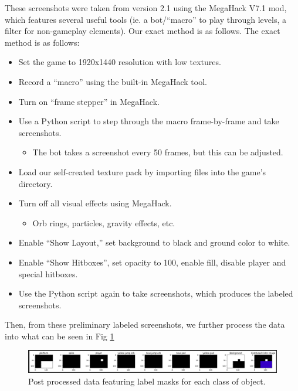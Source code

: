 \documentclass{article} %
\begin{document}
	These screenshots were taken from version 2.1 using the MegaHack V7.1 mod, which features several useful tools (ie. a bot/“macro” to play through levels, a filter for non-gameplay elements). Our exact method is as follows. The exact method is as follows:

\begin{itemize}
    \item Set the game to 1920x1440 resolution with low textures.
    \item Record a “macro” using the built-in MegaHack tool.
    \item Turn on “frame stepper” in MegaHack.
    \item Use a Python script to step through the macro frame-by-frame and take screenshots.
    \begin{itemize}
        \item The bot takes a screenshot every 50 frames, but this can be adjusted.
    \end{itemize}
    \item Load our self-created texture pack by importing files into the game’s directory.
    \item Turn off all visual effects using MegaHack.
    \begin{itemize}
        \item Orb rings, particles, gravity effects, etc.
    \end{itemize}
    \item Enable “Show Layout,” set background to black and ground color to white.
    \item Enable “Show Hitboxes”, set opacity to 100, enable fill, disable player and special hitboxes.
    \item Use the Python script again to take screenshots, which produces the labeled screenshots.
\end{itemize}


Then, from these preliminary labeled screenshots, we further process the data into what can be seen in Fig \ref{fig:labels after post processing}

\begin{figure}[!h]
\begin{center}
\includegraphics[width=1\textwidth]{Figs/labels after post processing.png}
\end{center}
\caption{Post processed data featuring label masks for each class of object.}
\label{fig:labels after post processing}
\end{figure}
\end{document}
